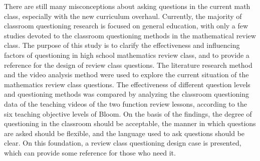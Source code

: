 \documentclass{CCNUthesis}
\begin{document}



\frontmatter


\tableofcontents


\begin{abstract}
  在新课改的背景下，当前的数学课堂提问仍存在着许多误区。目前多数对于课堂提问的研究都是面向普通教育的，少有针对数学学科教学复习课型提问的相关研究。本研究目的在于厘清高中数学复习课课堂提问有效性及影响因素，为复习课课堂提问设计提供参考依据。通过分析两节函数复习课教学录像的课堂提问数据，依据布鲁姆六大教学目标层次，采用文献研究法和录像分析法，对数学复习课课堂提问现状进行了探究，并对比了不同提问层次、提问方式的有效性。分析结果显示，课堂提问层次需合理，提问方式需灵活，提问语言需清晰。在此基础上，提供了数列复习课提问设计案例，供需要者提供一些参考。
\end{abstract}

\begin{abstract*}
  There are still many misconceptions about asking questions in the current math class, especially with the new curriculum overhaul. Currently, the majority of classroom questioning research is focused on general education, with only a few studies devoted to the classroom questioning methods in the mathematical review class. The purpose of this study is to clarify the effectiveness and influencing factors of questioning in high school mathematics review class, and to provide a reference for the design of review class questions. The literature research method and the video analysis method were used to explore the current situation of the mathematics review class questions. The effectiveness of different question levels and questioning methods was compared by analyzing the classroom questioning data of the teaching videos of the two function review lessons, according to the six teaching objective levels of Bloom.  On the basis of the findings, the degree of questioning in the classroom should be acceptable, the manner in which questions are asked should be flexible, and the language used to ask questions should be clear. On this foundation, a review class questioning design case is presented, which can provide some reference for those who need it.
\end{abstract*}
\end{document}
